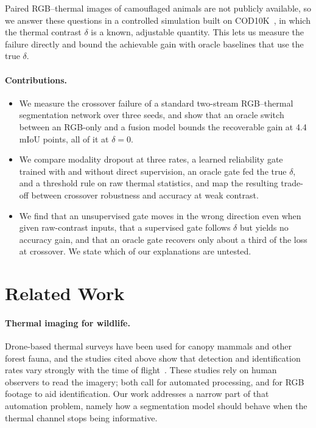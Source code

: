 \documentclass[runningheads]{llncs}
\begin{document}
Paired RGB--thermal images of camouflaged animals are not publicly available, so we answer these questions in a controlled simulation built on COD10K~\cite{sinet}, in which the thermal contrast $\delta$ is a known, adjustable quantity. This lets us measure the failure directly and bound the achievable gain with oracle baselines that use the true $\delta$.

\paragraph{Contributions.}
\begin{itemize}
\item We measure the crossover failure of a standard two-stream RGB--thermal segmentation network over three seeds, and show that an oracle switch between an RGB-only and a fusion model bounds the recoverable gain at 4.4 mIoU points, all of it at $\delta=0$.
\item We compare modality dropout at three rates, a learned reliability gate trained with and without direct supervision, an oracle gate fed the true $\delta$, and a threshold rule on raw thermal statistics, and map the resulting trade-off between crossover robustness and accuracy at weak contrast.
\item We find that an unsupervised gate moves in the wrong direction even when given raw-contrast inputs, that a supervised gate follows $\delta$ but yields no accuracy gain, and that an oracle gate recovers only about a third of the loss at crossover. We state which of our explanations are untested.
\end{itemize}

\section{Related Work}
\paragraph{Thermal imaging for wildlife.}
Drone-based thermal surveys have been used for canopy mammals and other forest fauna, and the studies cited above show that detection and identification rates vary strongly with the time of flight~\cite{kays,whitworth,beaver,mccarthy,burke,corcoran}. These studies rely on human observers to read the imagery; both call for automated processing, and for RGB footage to aid identification. Our work addresses a narrow part of that automation problem, namely how a segmentation model should behave when the thermal channel stops being informative.
\end{document}
